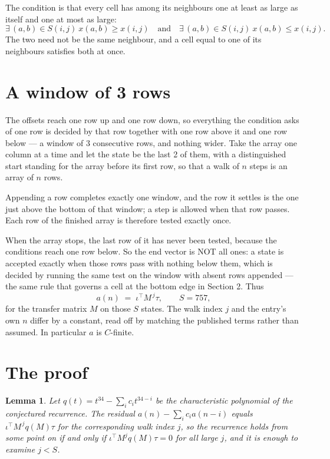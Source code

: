 \documentclass[11pt,a4paper]{article}
\theoremstyle{plain}
\newtheorem{lemma}[theorem]{Lemma}
\theoremstyle{definition}
\begin{document}
The condition is that every cell has among its neighbours one at least as large as itself and one at most as large:
\[
\exists\,(a,b)\in S(i,j)\ x(a,b)\ge x(i,j)\quad\text{and}\quad\exists\,(a,b)\in S(i,j)\ x(a,b)\le x(i,j).
\]
The two need not be the same neighbour, and a cell equal to one of its neighbours satisfies both at once.

\section{A window of 3 rows}

The offsets reach one row up and one row down, so everything the condition asks of one row is
decided by that row together with one row above it and one row below --- a window of
$3$ consecutive rows, and nothing wider. Take the array one column at a time and
let the state be the last 2 of them, with a distinguished start standing for the array before its
first row, so that a walk of $n$ steps is an array of $n$ rows.

Appending a row completes exactly one window, and the row it settles is the one just above the bottom of that window; a step is
allowed when that row passes. Each row of the finished array is therefore tested exactly once.

When the array stops, the last row of it has never been tested, because the
conditions reach one row below. So the end vector is NOT all ones: a state is accepted exactly when
those rows pass with nothing below them, which is decided by running the same test on the window
with absent rows appended --- the same rule that governs a cell at the bottom edge in
Section 2.
Thus
\[
a(n)\;=\;\iota^{\!\top}M^{\,j}\tau ,\qquad S=757,
\]
for the transfer matrix $M$ on those $S$ states. The walk index $j$ and the entry's own $n$
differ by a constant, read off by matching the published terms rather than assumed. In
particular $a$ is $C$-finite.

\section{The proof}

\begin{lemma}\label{lem:crit}
Let $q(t)=t^{34}-\sum_i c_it^{34-i}$ be the characteristic polynomial of the
conjectured recurrence. The residual $a(n)-\sum_ic_ia(n-i)$ equals
$\iota^{\!\top}M^{\,j}q(M)\tau$ for the corresponding walk index $j$, so the recurrence
holds from some point on if and only if $\iota^{\!\top}M^{j}q(M)\tau=0$ for all large $j$,
and it is enough to examine $j<S$.
\end{lemma}
\end{document}

